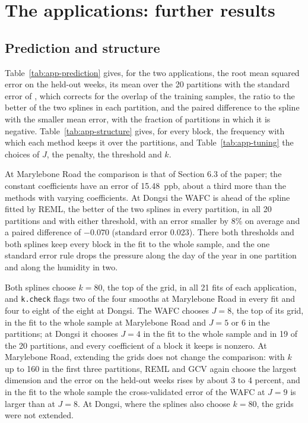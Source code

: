 \documentclass[10pt]{book}
\theoremstyle{definition}
\begin{document}
{\color{colR1}
\section{The applications: further results}
\label{sec:supp-app}

\subsection*{Prediction and structure}

Table~\ref{tab:app-prediction} gives, for the two applications, the root mean
squared error on the held-out weeks, its mean over the 20 partitions with the
standard error of \citet{Nadeau-Bengio-2003}, which corrects for the overlap
of the training samples, the ratio to the better of the two splines in each
partition, and the paired difference to the spline with the smaller mean
error, with the fraction of partitions in which it is negative.
Table~\ref{tab:app-structure} gives, for every block, the frequency with
which each method keeps it over the partitions, and
Table~\ref{tab:app-tuning} the choices of $J$, the penalty, the threshold
and $k$.

At Marylebone Road the comparison is that of Section 6.3 of the paper; the
constant coefficients have an error of 15.48~ppb, about a third more than
the methods with varying coefficients. At Dongsi the WAFC is ahead of the
spline fitted by REML, the better of the two splines in every partition, in
all 20 partitions and with either threshold, with an error smaller by 8\% on
average and a paired difference of $-0.070$ (standard error 0.023). There
both thresholds and both splines keep every block in the fit to the whole
sample, and the one standard error rule drops the pressure along the day of
the year in one partition and along the humidity in two.

Both splines choose $k = 80$, the top of the grid, in all 21 fits of each
application, and \texttt{k.check} flags two of the four smooths at
Marylebone Road in every fit and four to eight of the eight at Dongsi. The
WAFC chooses $J = 8$, the top of its grid, in the fit to the whole sample at
Marylebone Road and $J = 5$ or 6 in the partitions; at Dongsi it chooses
$J = 4$ in the fit to the whole sample and in 19 of the 20 partitions, and
every coefficient of a block it keeps is nonzero. At Marylebone Road,
extending the grids does not change the comparison: with $k$ up to 160 in
the first three partitions, REML and GCV again choose the largest dimension
and the error on the held-out weeks rises by about 3 to 4 percent, and in the
fit to the whole sample the cross-validated error of the WAFC at $J = 9$ is
larger than at $J = 8$. At Dongsi, where the splines also choose $k = 80$,
the grids were not extended.

}
\end{document}
